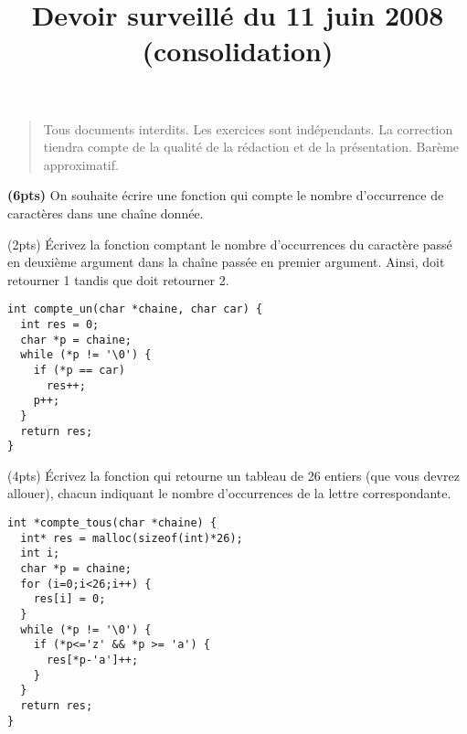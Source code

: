 \documentclass[10pt]{article}
\title{Devoir surveillé du 11 juin 2008 (consolidation)}
\begin{document}
\maketitle
\thispagestyle{empty}

\begin{quote}
  Tous documents interdits. Les exercices sont indépendants. La correction
  tiendra compte de la qualité de la rédaction et de la présentation. Barème
  approximatif.
\end{quote}


\begin{Exercice} \textbf{(6pts)}
  On souhaite écrire une fonction qui compte le nombre d'occurrence de
  caractères dans une chaîne donnée. 
  
  \Question (2pts) Écrivez la fonction  comptant le nombre d'occurrences du caractère passé en
  deuxième argument dans la chaîne passée en premier argument. Ainsi,
   doit retourner 1 tandis que 
   doit retourner 2.

\begin{Reponse}
  \begin{Verbatim}
int compte_un(char *chaine, char car) {
  int res = 0;
  char *p = chaine;
  while (*p != '\0') {
    if (*p == car)
      res++;
    p++;
  }
  return res;
}
\end{Verbatim}
\end{Reponse}

\Question (4pts) Écrivez la fonction  qui
retourne un tableau de 26 entiers (que vous devrez allouer), chacun indiquant
le nombre d'occurrences de la lettre correspondante.

\begin{Reponse}
\begin{Verbatim}
int *compte_tous(char *chaine) {
  int* res = malloc(sizeof(int)*26);
  int i;
  char *p = chaine;
  for (i=0;i<26;i++) {
    res[i] = 0;
  }
  while (*p != '\0') {
    if (*p<='z' && *p >= 'a') {
      res[*p-'a']++;
    }
  }
  return res;
}
  \end{Verbatim}
\end{Reponse}
\end{Exercice}
\end{document}
